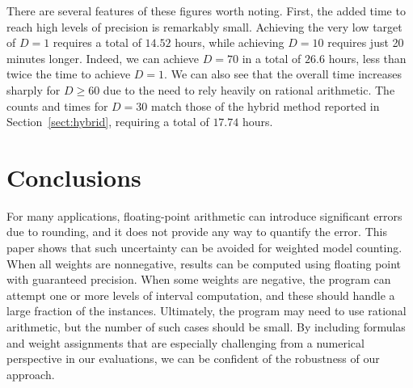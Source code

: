 \documentclass[
hf
]{ceurart}
\begin{document}
There are several features of these figures worth noting.  First, the
added time to reach high levels of precision is remarkably small.
Achieving the very low target of $D=1$ requires a total of $14.52$ hours,
while achieving $D=10$ requires just
20 minutes longer.  Indeed, we can achieve $D=70$ in a total of $26.6$
hours, less than twice the time to achieve $D=1$.  We can also see
that the overall time increases sharply for $D \geq 60$ due to the
need to rely heavily on rational arithmetic.  The counts and times for $D=30$
match those of the hybrid method reported in Section~\ref{sect:hybrid},
requiring a total of $17.74$ hours.

\section{Conclusions}
\label{sect:conclusion}

For many applications, floating-point arithmetic can introduce
significant errors due to rounding, and it does not provide any way to
quantify the error.  This paper shows that such uncertainty can be
avoided for weighted model counting.  When all weights are
nonnegative, results can be computed using floating point with
guaranteed precision.  When some weights are negative, the program can
attempt one or more levels of interval computation, and these should
handle a large fraction of the instances.  Ultimately, the program may
need to use rational arithmetic, but the number of such cases should
be small.  By including formulas and weight assignments that are
especially challenging from a numerical perspective in our evaluations, we can be confident
of the robustness of our approach.
\end{document}
